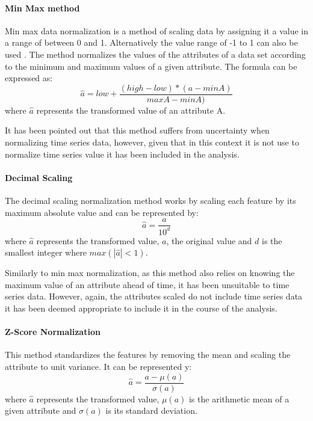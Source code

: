 \paragraph{Min Max method}\label{sec:data-modelling:scalers:min-max}
Min max data normalization is a method of scaling data by assigning it a value in a range of between 0 and 1. Alternatively the value range of -1 to 1 can also be used \cite{dataNormalization2014}. The method normalizes the values of the attributes of a data set according to the minimum and maximum values of a given attribute. The formula can be expressed as:
\begin{equation}\label{eq:min-max}
    \hat{a} = low+ \frac{(high - low)*(a - minA)}{maxA - minA)} 
\end{equation}
where $\hat{a}$ represents the transformed value of an attribute A.

It has been pointed out that this method suffers from uncertainty when normalizing time series data\cite{dataNormalization2014}, however, given that in this context it is not use to normalize time series value it has been included in the analysis.
\paragraph{Decimal Scaling}\label{sec:data-modelling:scalers:max-abs}
The decimal scaling normalization method works by scaling each feature by its maximum absolute value and can be represented by:
\begin{equation}
    \hat{a} = \frac{a}{10^d}
\end{equation}
where $\hat{a}$ represents the transformed value, $a$, the original value and $d$ is the smallest integer where $max(|\hat{a}|<1)$.

Similarly to min max normalization, as this method also relies on knowing the maximum value of an attribute ahead of time, it has been unsuitable to time series data\cite{dataNormalization2014}. However, again, the attributes scaled do not include time series data it has been deemed appropriate to include it in the course of the analysis.

\paragraph{Z-Score Normalization}\label{sec:data-modelling:scalers:standard}
This method standardizes the features by removing the mean and scaling the attribute to unit variance. It can be represented y:
\begin{equation}
    \hat{a} = \frac{a - \mu(a)}{\sigma(a)}
\end{equation}
where $\hat{a}$ represents the transformed value, $\mu(a)$ is the arithmetic mean of a given attribute and $\sigma(a)$ is its standard deviation.

